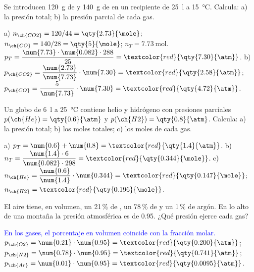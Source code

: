 \begin{exercise}
    Se introducen \qty{120}{\gram} de  y \qty{140}{\gram} de  en un recipiente de \qty{25}{\litre} a
    \qty{15}{\degreeCelsius}. Calcula: a) la presión total; b) la presión parcial de cada gas.
    \begin{solu}
        a) \(n_{\ch{CO2}} = 120/44 = \qty{2.73}{\mole}\); \(n_{\ch{CO}} = 140/28 = \qty{5}{\mole}\); \(n_T = \qty{7.73}{\mole}\).
        \(p_T = \dfrac{\num{7.73} \cdot \num{0.082} \cdot 288}{25} = \textcolor{red}{\qty{7.30}{\atm}}\).
        b) \(p_{\ch{CO2}} = \dfrac{\num{2.73}}{\num{7.73}} \cdot \num{7.30} = \textcolor{red}{\qty{2.58}{\atm}}\);
        \(p_{\ch{CO}} = \dfrac{5}{\num{7.73}} \cdot \num{7.30} = \textcolor{red}{\qty{4.72}{\atm}}\).
    \end{solu}
\end{exercise}

\begin{exercise}
    Un globo de \qty{6}{\litre} a \qty{25}{\degreeCelsius} contiene helio y hidrógeno con presiones parciales
    \(p(\ch{He}) = \qty{0.6}{\atm}\) y \(p(\ch{H2}) = \qty{0.8}{\atm}\). Calcula: a) la presión total; b) los moles totales;
    c) los moles de cada gas.
    \begin{solu}
        a) \(p_T = \num{0.6} + \num{0.8} = \textcolor{red}{\qty{1.4}{\atm}}\).
        b) \(n_T = \dfrac{\num{1.4} \cdot 6}{\num{0.082} \cdot 298} = \textcolor{red}{\qty{0.344}{\mole}}\).
        c) \(n_{\ch{He}} = \dfrac{\num{0.6}}{\num{1.4}} \cdot \num{0.344} = \textcolor{red}{\qty{0.147}{\mole}}\);
        \(n_{\ch{H2}} = \textcolor{red}{\qty{0.196}{\mole}}\).
    \end{solu}
\end{exercise}

\begin{exercise}
    El aire tiene, en volumen, un 21\,\% de , un 78\,\% de  y un 1\,\% de argón. En lo alto de una montaña la
    presión atmosférica es de \qty{0.95}{\atm}. ¿Qué presión ejerce cada gas?
    \begin{solu}
        \textcolor{blue}{En los gases, el porcentaje en volumen coincide con la fracción molar.}
        \(p_{\ch{O2}} = \num{0.21} \cdot \num{0.95} = \textcolor{red}{\qty{0.200}{\atm}}\);
        \(p_{\ch{N2}} = \num{0.78} \cdot \num{0.95} = \textcolor{red}{\qty{0.741}{\atm}}\);
        \(p_{\ch{Ar}} = \num{0.01} \cdot \num{0.95} = \textcolor{red}{\qty{0.0095}{\atm}}\).
    \end{solu}
\end{exercise}

